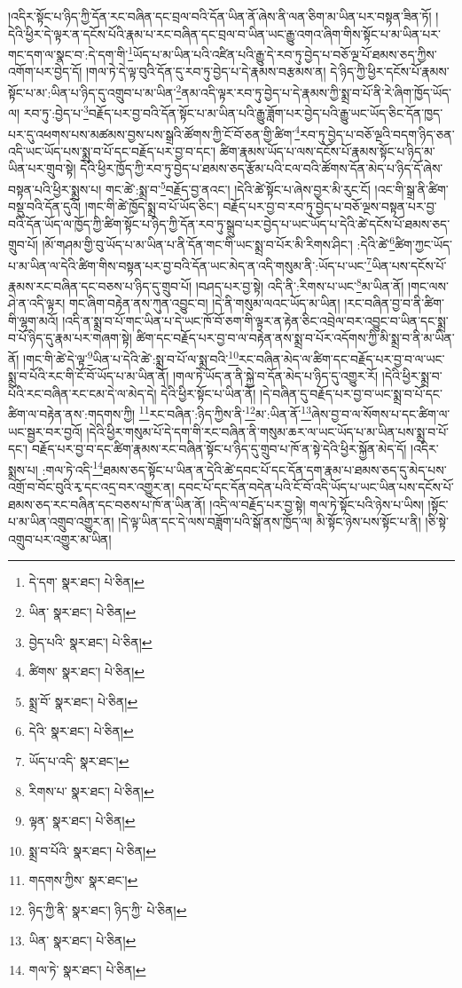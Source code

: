 །འདིར་སྟོང་པ་ཉིད་ཀྱི་དོན་རང་བཞིན་དང་བྲལ་བའི་དོན་ཡིན་ནོ་ཞེས་ནི་ལན་ཅིག་མ་ཡིན་པར་བསྟན་ཟིན་ཏོ། །དེའི་ཕྱིར་དེ་ལྟར་ན་དངོས་པོའི་རྣམ་པ་རང་བཞིན་དང་བྲལ་བ་ཡིན་ཡང་རྒྱུ་འགའ་ཞིག་གིས་སྟོང་པ་མ་ཡིན་པར་གང་དག་ལ་སྣང་བ་:དེ་དག་གི་\footnote{དེ་དག་  སྣར་ཐང་།  པེ་ཅིན། }ཡོད་པ་མ་ཡིན་པའི་འཛིན་པའི་རྒྱུ་དེ་རབ་ཏུ་བྱེད་པ་བཅོ་ལྔ་པོ་ཐམས་ཅད་ཀྱིས་འགོག་པར་བྱེད་དོ། །གལ་ཏེ་དེ་ལྟ་བུའི་དོན་དུ་རབ་ཏུ་བྱེད་པ་དེ་རྣམས་བརྩམས་ན། དེ་ཉིད་ཀྱི་ཕྱིར་དངོས་པོ་རྣམས་སྟོང་པ་མ་:ཡིན་པ་ཉིད་དུ་འགྲུབ་པ་མ་ཡིན་\footnote{ཡིན་  སྣར་ཐང་།  པེ་ཅིན། }ནམ་འདི་ལྟར་རབ་ཏུ་བྱེད་པ་དེ་རྣམས་ཀྱི་སྨྲ་བ་པོ་ནི་རེ་ཞིག་ཁྱོད་ཡོད་ལ། རབ་ཏུ་:བྱེད་པ་\footnote{བྱེད་པའི་  སྣར་ཐང་།  པེ་ཅིན། }བརྗོད་པར་བྱ་བའི་དོན་སྟོང་པ་མ་ཡིན་པའི་རྒྱུ་ཟློག་པར་བྱེད་པའི་རྒྱུ་ཡང་ཡོད་ཅིང་དོན་ཁྱད་པར་དུ་འཕགས་པས་མཚམས་བྱས་པས་སྒྲའི་ཚོགས་ཀྱི་ངོ་བོ་ཅན་གྱི་ཚིག་\footnote{ཚིགས་  སྣར་ཐང་།  པེ་ཅིན། }རབ་ཏུ་བྱེད་པ་བཅོ་ལྔའི་བདག་ཉིད་ཅན་འདི་ཡང་ཡོད་པས་སྨྲ་བ་པོ་དང་བརྗོད་པར་བྱ་བ་དང་། ཚིག་རྣམས་ཡོད་པ་ལས་དངོས་པོ་རྣམས་སྟོང་པ་ཉིད་མ་ཡིན་པར་གྲུབ་སྟེ། དེའི་ཕྱིར་ཁྱོད་ཀྱི་རབ་ཏུ་བྱེད་པ་ཐམས་ཅད་རྩོམ་པའི་ངལ་བའི་ཚོགས་དོན་མེད་པ་ཉིད་དོ་ཞེས་བསྟན་པའི་ཕྱིར་སྨྲས་པ། གང་ཚེ་:སྨྲ་བ་\footnote{སྨྲ་བོ་  སྣར་ཐང་།  པེ་ཅིན། }བརྗོད་བྱ་ནའང་། །དེའི་ཚེ་སྟོང་པ་ཞེས་བྱར་མི་རུང་ངོ། །འང་གི་སྒྲ་ནི་ཚིག་བསྡུ་བའི་དོན་དུའོ། །གང་གི་ཚེ་ཁྱོད་སྨྲ་བ་པོ་ཡོད་ཅིང་། བརྗོད་པར་བྱ་བ་རབ་ཏུ་བྱེད་པ་བཅོ་ལྔས་བསྟན་པར་བྱ་བའི་དོན་ཡོད་ལ་ཁྱོད་ཀྱི་ཚིག་སྟོང་པ་ཉིད་ཀྱི་དོན་རབ་ཏུ་སྒྲུབ་པར་བྱེད་པ་ཡང་ཡོད་པ་དེའི་ཚེ་དངོས་པོ་ཐམས་ཅད་གྲུབ་པོ། །མོ་གཤམ་གྱི་བུ་ཡོད་པ་མ་ཡིན་པ་ནི་དོན་གང་གི་ཡང་སྨྲ་བ་པོར་མི་རིགས་ཤིང་། :དེའི་ཚེ་\footnote{དེའི་  སྣར་ཐང་།  པེ་ཅིན། }ཚིག་ཀྱང་ཡོད་པ་མ་ཡིན་ལ་དེའི་ཚིག་གིས་བསྟན་པར་བྱ་བའི་དོན་ཡང་མེད་ན་འདི་གསུམ་ནི་:ཡོད་པ་ཡང་\footnote{ཡོད་པ་འདི་  སྣར་ཐང་། }ཡིན་པས་དངོས་པོ་རྣམས་རང་བཞིན་དང་བཅས་པ་ཉིད་དུ་གྲུབ་པོ། །བཤད་པར་བྱ་སྟེ། འདི་ནི་:རིགས་པ་ཡང་\footnote{རིགས་པ་  སྣར་ཐང་།  པེ་ཅིན། }མ་ཡིན་ནོ། །གང་ལས་ཤེ་ན་འདི་ལྟར། གང་ཞིག་བརྟེན་ནས་ཀུན་འབྱུང་བ། །དེ་ནི་གསུམ་ལའང་ཡོད་མ་ཡིན། །རང་བཞིན་བྱ་བ་ནི་ཚིག་གི་ལྷག་མའོ། །འདི་ན་སྨྲ་བ་པོ་གང་ཡིན་པ་དེ་ཡང་ཁོ་བོ་ཅག་གི་ལྟར་ན་རྟེན་ཅིང་འབྲེལ་བར་འབྱུང་བ་ཡིན་དང་སྨྲ་བ་པོ་ཉིད་དུ་རྣམ་པར་གཞག་སྟེ། ཚིག་དང་བརྗོད་པར་བྱ་བ་ལ་བརྟེན་ནས་སྨྲ་བ་པོར་འདོགས་ཀྱི་མི་སྨྲ་བ་ནི་མ་ཡིན་ནོ། །གང་གི་ཚེ་དེ་ལྟ་\footnote{ལྟན་  སྣར་ཐང་།  པེ་ཅིན། }ཡིན་པ་དེའི་ཚེ་:སྨྲ་བ་པོ་ལ་སྨྲ་བའི་\footnote{སྨྲ་བ་པོའི་  སྣར་ཐང་།  པེ་ཅིན། }རང་བཞིན་མེད་ལ་ཚིག་དང་བརྗོད་པར་བྱ་བ་ལ་ཡང་སྨྲ་བ་པོའི་རང་གི་ངོ་བོ་ཡོད་པ་མ་ཡིན་ནོ། །གལ་ཏེ་ཡོད་ན་ནི་སྐྱེ་བ་དོན་མེད་པ་ཉིད་དུ་འགྱུར་རོ། །དེའི་ཕྱིར་སྨྲ་བ་པོའི་རང་བཞིན་རང་ངམ་དེ་ལ་མེད་དེ། དེའི་ཕྱིར་སྟོང་པ་ཡིན་ནོ། །དེ་བཞིན་དུ་བརྗོད་པར་བྱ་བ་ཡང་སྨྲ་བ་པོ་དང་ཚིག་ལ་བརྟེན་ནས་:གདགས་ཀྱི། \footnote{གདགས་ཀྱིས་  སྣར་ཐང་། }རང་བཞིན་:ཉིད་ཀྱིས་ནི་\footnote{ཉིད་ཀྱི་ནི་  སྣར་ཐང་། ཉིད་ཀྱི་  པེ་ཅིན། }མ་:ཡིན་ནོ་\footnote{ཡིན་  སྣར་ཐང་།  པེ་ཅིན། }ཞེས་བྱ་བ་ལ་སོགས་པ་དང་ཚིག་ལ་ཡང་སྦྱར་བར་བྱའོ། །དེའི་ཕྱིར་གསུམ་པོ་དེ་དག་གི་རང་བཞིན་ནི་གསུམ་ཆར་ལ་ཡང་ཡོད་པ་མ་ཡིན་པས་སྨྲ་བ་པོ་དང་། བརྗོད་པར་བྱ་བ་དང་ཚིག་རྣམས་རང་བཞིན་སྟོང་པ་ཉིད་དུ་གྲུབ་པ་ཁོ་ན་སྟེ་དེའི་ཕྱིར་སྐྱོན་མེད་དོ། །འདིར་སྨྲས་པ། :གལ་ཏེ་འདི་\footnote{གལ་ཏེ་  སྣར་ཐང་།  པེ་ཅིན། }ཐམས་ཅད་སྟོང་པ་ཡིན་ན་དེའི་ཚེ་དབང་པོ་དང་དོན་དག་རྣམ་པ་ཐམས་ཅད་དུ་མེད་པས་འགྲོ་བ་བོང་བུའི་རྭ་དང་འདྲ་བར་འགྱུར་ན། དབང་པོ་དང་དོན་བདེན་པའི་ངོ་བོ་འདི་ཡོད་པ་ཡང་ཡིན་པས་དངོས་པོ་ཐམས་ཅད་རང་བཞིན་དང་བཅས་པ་ཁོ་ན་ཡིན་ནོ། །འདི་ལ་བརྗོད་པར་བྱ་སྟེ། གལ་ཏེ་སྟོང་པའི་ཉེས་པ་ཡིས། །སྟོང་པ་མ་ཡིན་འགྲུབ་འགྱུར་ན། །དེ་ལྟ་ཡིན་དང་དེ་ལས་བཟློག་པའི་སྒོ་ནས་ཁྱོད་ལ། མི་སྟོང་ཉེས་པས་སྟོང་པ་ནི། །ཅི་སྟེ་འགྲུབ་པར་འགྱུར་མ་ཡིན། 
